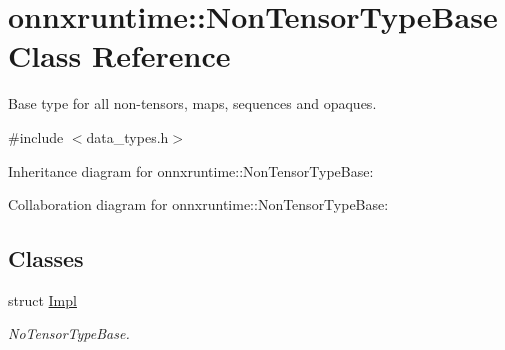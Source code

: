 \hypertarget{classonnxruntime_1_1NonTensorTypeBase}{}\section{onnxruntime\+:\+:Non\+Tensor\+Type\+Base Class Reference}
\label{classonnxruntime_1_1NonTensorTypeBase}


Base type for all non-\/tensors, maps, sequences and opaques.  




{\ttfamily \#include $<$data\+\_\+types.\+h$>$}



Inheritance diagram for onnxruntime\+:\+:Non\+Tensor\+Type\+Base\+:


Collaboration diagram for onnxruntime\+:\+:Non\+Tensor\+Type\+Base\+:
\subsection*{Classes}
\begin{DoxyCompactItemize}
\item 
struct \mbox{\hyperlink{structonnxruntime_1_1NonTensorTypeBase_1_1Impl}{Impl}}
\begin{DoxyCompactList}\small\item\em No\+Tensor\+Type\+Base. \end{DoxyCompactList}\end{DoxyCompactItemize}
